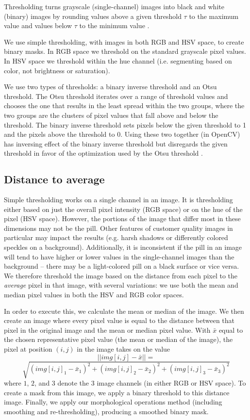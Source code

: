 \documentclass{article}
\begin{document}
Thresholding turns grayscale (single-channel) images into black and white (binary) images by rounding values above a given threshold $\tau$ to the maximum value and values below $\tau$ to the minimum value \cite{cv-textbook}. 

We use simple thresholding, with images in both RGB and HSV space, to create binary masks. In RGB space we threshold on the standard grayscale pixel values. In HSV space we threshold within the hue channel (i.e. segmenting based on color, not brightness or saturation). 

We use two types of thresholds: a binary inverse threshold and an Otsu threshold. The Otsu threshold iterates over a range of threshold values and chooses the one that results in the least spread within the two groups, where the two groups are the clusters of pixel values that fall above and below the threshold. The binary inverse threshold sets pixels below the given threshold to 1 and the pixels above the threshold to 0. Using these two together (in OpenCV) has inversing effect of the binary inverse threshold but disregards the given threshold in favor of the optimization used by the Otsu threshold \cite{cv-textbook}. 

\subsection{Distance to average}

Simple thresholding works on a single channel in an image. It is thresholding either based on just the overall pixel intensity (RGB space) or on the hue of the pixel (HSV space). However, the portions of the image that differ most in these dimensions may not be the pill. Other features of customer quality images in particular may impact the results (e.g. harsh shadows or differently colored speckles on a background). Additionally, it is inconsistent if the pill in an image will tend to have higher or lower values in the single-channel images than the background -- there may be a light-colored pill on a black surface or vice versa. We therefore threshold the image based on the distance from each pixel to the \textit{average} pixel in that image, with several variations: we use both the mean and median pixel values in both the HSV and RGB color spaces. 

In order to execute this, we calculate the mean or median of the image. We then create an image where every pixel value is equal to the distance between that pixel in the original image and the mean or median pixel value. With $\bar{x}$ equal to the chosen representative pixel value (the mean or median of the image), the pixel at position $(i, j)$ in the image takes on the value 
\small
$$||img[i, j] - \bar{x}|| =$$
$$\sqrt{(img[i, j]_1 - \bar{x}_1)^2+(img[i, j]_2 - \bar{x}_2)^2 + (img[i, j]_3 - \bar{x}_3)^2}$$
\normalsize
where $1$, $2$, and $3$ denote the 3 image channels (in either RGB or HSV space). To create a mask from this image, we apply a binary threshold to this distance image. Finally, we apply our morphological operations method (including smoothing and re-thresholding), producing a smoothed binary mask. 
\end{document}
